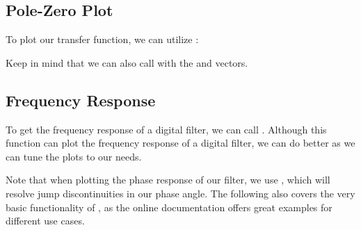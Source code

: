 \documentclass{article}
\begin{document}

\newpage

\subsection{Pole-Zero Plot}

To plot our transfer function, we can utilize :


Keep in mind that we can also call  with the  and
 vectors.

\subsection{Frequency Response}

To get the frequency response of a digital filter, we can call
.  Although this function can plot the frequency response of a
digital filter, we can do better as we can tune the plots to our needs.

Note that when plotting the phase response of our filter, we use
, which will resolve jump discontinuities in our phase angle.
The following also covers the very basic functionality of , as the
online documentation offers great examples for different use cases.

\end{document}
